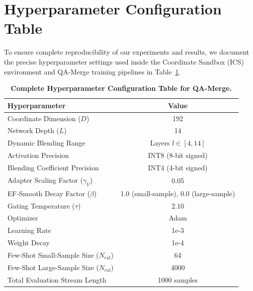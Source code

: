 \documentclass{article}
\theoremstyle{plain}
\theoremstyle{definition}
\theoremstyle{remark}
\begin{document}
\section{Hyperparameter Configuration Table}
\label{app:hyperparameters}

To ensure complete reproducibility of our experiments and results, we document the precise hyperparameter settings used inside the Coordinate Sandbox (ICS) environment and QA-Merge training pipelines in Table~\ref{tab:hyperparameters}.

\begin{table}[H]
\caption{\textbf{Complete Hyperparameter Configuration Table for QA-Merge.}}
\label{tab:hyperparameters}
\vskip 0.15in
\begin{center}
\begin{small}
\begin{tabular}{lc}
\toprule
\textbf{Hyperparameter} & \textbf{Value} \\
\midrule
Coordinate Dimension ($D$) & 192 \\
Network Depth ($L$) & 14 \\
Dynamic Blending Range & Layers $l \in [4, 14]$ \\
Activation Precision & INT8 (8-bit signed) \\
Blending Coefficient Precision & INT4 (4-bit signed) \\
Adapter Scaling Factor ($\gamma_V$) & 0.05 \\
EF-Smooth Decay Factor ($\beta$) & 1.0 (small-sample), 0.0 (large-sample) \\
Gating Temperature ($\tau$) & 2.10 \\
Optimizer & Adam \cite{kingma2014adam} \\
Learning Rate & 1e-3 \\
Weight Decay & 1e-4 \\
Few-Shot Small-Sample Size ($N_{\text{cal}}$) & 64 \\
Few-Shot Large-Sample Size ($N_{\text{cal}}$) & 4000 \\
Total Evaluation Stream Length & 1000 samples \\
\bottomrule
\end{tabular}
\end{small}
\end{center}
\vskip -0.1in
\end{table}
\end{document}

